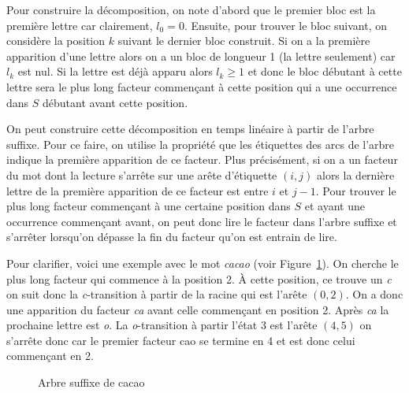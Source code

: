\documentclass[10pt,letterpaper,oneside]{article}
\begin{document}
    Pour construire la décomposition, on note d'abord que le premier bloc est la première lettre car clairement, $l_0=0$. Ensuite, pour trouver le bloc suivant, on considère la position $k$ suivant le dernier bloc construit. Si on a la première apparition d'une lettre alors on a un bloc de longueur 1 (la lettre seulement) car $l_k$ est nul. Si la lettre est déjà apparu alors $l_k\geq 1$ et donc le bloc débutant à cette lettre sera le plus long facteur commençant à cette position qui a une occurrence dans $S$ débutant avant cette position.
    
    On peut construire cette décomposition en temps linéaire à partir de l'arbre suffixe. Pour ce faire, on utilise la propriété que les étiquettes des arcs de l'arbre indique la première apparition de ce facteur. Plus précisément, si on a un facteur du mot dont la lecture s'arrête sur une arête d'étiquette $(i,j)$ alors la dernière lettre de la première apparition de ce facteur est entre $i$ et $j-1$. 
    Pour trouver le plus long facteur commençant à une certaine position dans $S$ et ayant une occurrence commençant avant, on peut donc lire le facteur dans l'arbre suffixe et s'arrêter lorsqu'on dépasse la fin du facteur qu'on est entrain de lire. 
    
    Pour clarifier, voici une exemple avec le mot \emph{cacao} (voir Figure~\ref{fig:caco_suffix_tree}).
    On cherche le plus long facteur qui commence à la position 2. À cette position, ce trouve un \emph{c} on suit donc la \emph{c}-transition à partir de la racine qui est l'arête $(0,2)$. On a donc une apparition du facteur \emph{ca} avant celle commençant en position 2. Après \emph{ca} la prochaine lettre est \emph{o}. La \emph{o}-transition à partir l'état 3 est l'arête $(4,5)$ on s'arrête donc  car le premier facteur cao se termine en 4 et est donc celui commençant en 2.
    
    \begin{figure}[htb]
        \centering
        
        \caption{Arbre suffixe de cacao}\label{fig:caco_suffix_tree}
    \end{figure}
\end{document}
